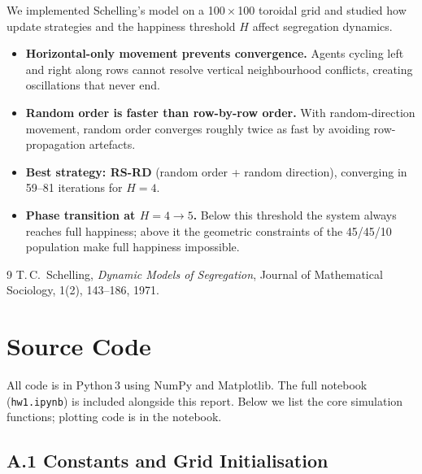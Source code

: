 \documentclass[11pt, a4paper]{article}
\begin{document}
We implemented Schelling's model on a 100\,×\,100 toroidal grid and studied how update
strategies and the happiness threshold $H$ affect segregation dynamics.

\begin{itemize}
  \item \textbf{Horizontal-only movement prevents convergence.} Agents cycling left and
    right along rows cannot resolve vertical neighbourhood conflicts, creating
    oscillations that never end.
  \item \textbf{Random order is faster than row-by-row order.} With random-direction
    movement, random order converges roughly twice as fast by avoiding row-propagation
    artefacts.
  \item \textbf{Best strategy: RS-RD} (random order + random direction), converging in
    59--81 iterations for $H = 4$.
  \item \textbf{Phase transition at $H = 4 \to 5$.} Below this threshold the system
    always reaches full happiness; above it the geometric constraints of the 45/45/10
    population make full happiness impossible.
\end{itemize}

\begin{thebibliography}{9}
    T.\,C.\ Schelling,
    \textit{Dynamic Models of Segregation},
    Journal of Mathematical Sociology, 1(2), 143--186, 1971.
\end{thebibliography}

\appendix
\section{Source Code}

All code is in Python\,3 using NumPy and Matplotlib. The full notebook (\texttt{hw1.ipynb})
is included alongside this report. Below we list the core simulation functions; plotting
code is in the notebook.

\subsection*{A.1 \quad Constants and Grid Initialisation}
\end{document}

